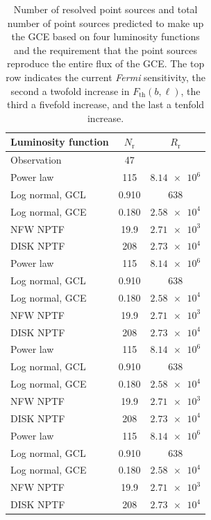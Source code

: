 \documentclass[a4paper,11pt]{article}
\begin{document}
\begin{table}
    \centering
    \begin{tabular}{|l|c|c|}
        \hline
        Luminosity function & $N_\text{r}$ & $R_\text{r}$\\ \hline \hline
        Observation & 47 & \\ \hline
        Power law & 115 & $\num{8.14e6}$ \\
        Log normal, GCL & 0.910 & 638 \\
        Log normal, GCE & 0.180 & $\num{2.58e4}$ \\
        NFW NPTF & 19.9 & $\num{2.71e3}$ \\
        DISK NPTF & 208 & $\num{2.73e4}$ \\
        \hline \hline
        Power law & 115 & $\num{8.14e6}$ \\
        Log normal, GCL & 0.910 & 638 \\
        Log normal, GCE & 0.180 & $\num{2.58e4}$ \\
        NFW NPTF & 19.9 & $\num{2.71e3}$ \\
        DISK NPTF & 208 & $\num{2.73e4}$ \\
        \hline \hline
        Power law & 115 & $\num{8.14e6}$ \\
        Log normal, GCL & 0.910 & 638 \\
        Log normal, GCE & 0.180 & $\num{2.58e4}$ \\
        NFW NPTF & 19.9 & $\num{2.71e3}$ \\
        DISK NPTF & 208 & $\num{2.73e4}$ \\
        \hline \hline
        Power law & 115 & $\num{8.14e6}$ \\
        Log normal, GCL & 0.910 & 638 \\
        Log normal, GCE & 0.180 & $\num{2.58e4}$ \\
        NFW NPTF & 19.9 & $\num{2.71e3}$ \\
        DISK NPTF & 208 & $\num{2.73e4}$ \\
        \hline
    \end{tabular}
    \caption{Number of resolved point sources and total number of point sources predicted to make up the GCE based on four luminosity functions and the requirement that the point sources reproduce the entire flux of the GCE. The top row indicates the current \textit{Fermi} sensitivity, the second a twofold increase in $F_\text{th}(b, \ell)$, the third a fivefold increase, and the last a tenfold increase.}
    \label{tab:sensitivity-values}
\end{table}
\end{document}
